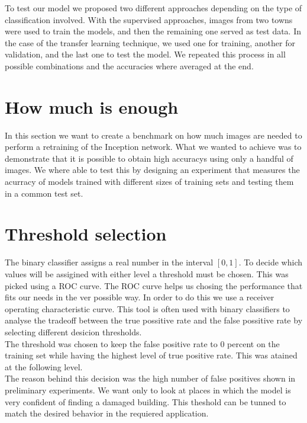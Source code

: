 To test our model we proposed two different approaches depending on the type of classification involved. With the supervised approaches, images from two towns were used to train the models, and then the remaining one served as test data. In the case of the transfer learning technique, we used one for training, another for validation, and the last one to test the model. We repeated this process in all possible combinations and the accuracies where averaged at the end.\\


\section{How much is enough}


In this section we want to create a benchmark on how much images are needed to perform a retraining of the Inception network. What we wanted to achieve was to demonstrate that it is possible to obtain high accuracys using only a handful of images. We where able to test this by designing an experiment that measures the acurracy of models trained with different sizes of training sets and testing them in a common test set.\\


\section{Threshold selection}

The binary classifier assigns a real number in the interval $[0,1]$. To decide which values will be assigined with either level a threshold must be chosen. This was picked using a ROC curve. The ROC curve helps us chosing the performance that fits our needs in the ver possible way. In order to do this we use a receiver operating characteristic curve. This tool is often used with binary classifiers to analyse the tradeoff between the true possitive rate and the false possitive rate by selecting different desicion thresholds.\\

The threshold was chosen to keep the false positive rate to 0 percent on the training set while having the highest level of true positive rate. This was atained at the following level.\\

The reason behind this decision was the high number of false positives shown in preliminary experiments. We want only to look at places in which the model is very confident of finding a damaged building. This theshold can be tunned to match the desired behavior in the requiered application.\\


